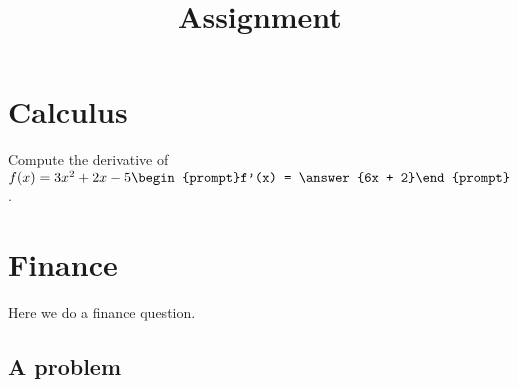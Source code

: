 \documentclass[noauthor,nooutcomes]{ximera}
\title{Assignment}
\begin{document}
\begin{abstract}
\end{abstract}
\maketitle

\section{Calculus}

\begin{problem}
  Compute the derivative of $f(x) = 3x^2 + 2x - 5 %
  \begin{prompt}f'(x) = \answer{6x + 2}%
  \end{prompt}$.
\end{problem}

\section{Finance}

Here we do a finance question.

\subsection{A problem}
\end{document}
